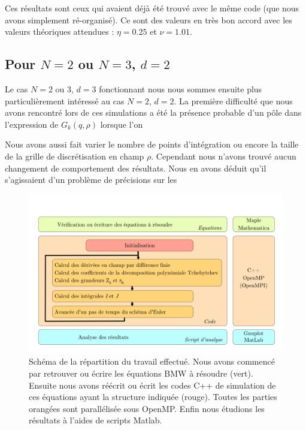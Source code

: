 \documentclass[10.5pt]{article}
\begin{document}
\begin{multicols*}{2}
Ces résultats sont ceux qui avaient déjà été trouvé avec le même code (que nous avons simplement ré-organisé). Ce sont des valeurs en très bon accord avec les valeurs théoriques attendues : $\eta = 0.25$ et $\nu = 1.01$.  \\



\subsection{Pour $N = 2$ ou $N=3$, $d=2$}

Le cas $N = 2$ ou 3, $d=3$ fonctionnant nous nous sommes ensuite plus particulièrement intéressé au cas $N = 2$, $d = 2$. La première difficulté que nous avons rencontré lors de ces simulations a été la présence probable d'un pôle dans l'expression de $G_k(q, \rho)$ lorsque l'on 

Nous avons aussi fait varier le nombre de points d'intégration ou encore la taille de la grille de discrétisation en champ $\rho$. Cependant nous n'avons trouvé aucun changement de comportement des résultats.
Nous en avons déduit qu'il s'agissaient d'un problème de précisions sur les

\end{multicols*}
\begin{figure}[H]
	\begin{center}
		\includegraphics[width=0.95\columnwidth]{Diagramme_Code_2.pdf}
		\caption{Schéma de la répartition du travail effectué. Nous avons commencé par retrouver ou écrire les équations BMW à résoudre (vert). Ensuite nous avons réécrit ou écrit les codes C++ de simulation de ces équations ayant la structure indiquée (rouge). Toutes les parties orangées sont parallélisée sous OpenMP. Enfin nous étudions les résultats à l'aides de scripts Matlab.}
		\label{fig:org}
	\end{center}
\end{figure}
\end{document}
